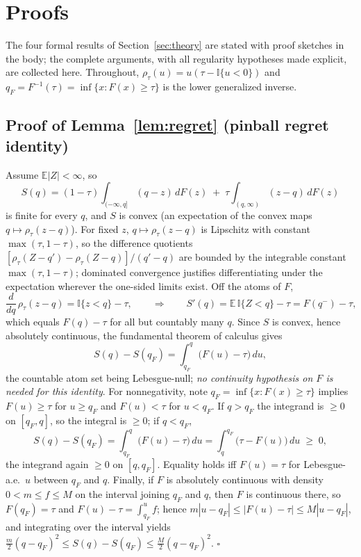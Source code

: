 \documentclass[11pt]{article}
\theoremstyle{remark}
\begin{document}



\appendix

\section{Proofs}\label{app:proofs}

The four formal results of Section~\ref{sec:theory} are stated with
proof sketches in the body; the complete arguments, with all regularity
hypotheses made explicit, are collected here. Throughout, $\rho_\tau(u)
= u(\tau - \mathbb{I}\{u<0\})$ and $q_F = F^{-1}(\tau) = \inf\{x:F(x)\ge
\tau\}$ is the lower generalized inverse.

\subsection*{Proof of Lemma~\ref{lem:regret} (pinball regret identity)}

Assume $\mathbb{E}|Z|<\infty$, so
\[
S(q) = (1-\tau)\!\int_{(-\infty,q]}\!(q-z)\,dF(z)
\;+\; \tau\!\int_{(q,\infty)}\!(z-q)\,dF(z)
\]
is finite for every $q$, and $S$ is convex (an expectation of the
convex maps $q\mapsto\rho_\tau(z-q)$). For fixed $z$, $q\mapsto
\rho_\tau(z-q)$ is Lipschitz with constant $\max(\tau,1-\tau)$, so the
difference quotients $[\rho_\tau(Z-q')-\rho_\tau(Z-q)]/(q'-q)$ are
bounded by the integrable constant $\max(\tau,1-\tau)$; dominated
convergence justifies differentiating under the expectation wherever the
one-sided limits exist. Off the atoms of $F$,
\[
\frac{d}{dq}\,\rho_\tau(z-q) = \mathbb{I}\{z<q\}-\tau ,
\qquad\Longrightarrow\qquad
S'(q) = \mathbb{E}\,\mathbb{I}\{Z<q\}-\tau = F(q^-)-\tau,
\]
which equals $F(q)-\tau$ for all but countably many $q$. Since $S$ is
convex, hence absolutely continuous, the fundamental theorem of
calculus gives
\[
S(q)-S(q_F)=\int_{q_F}^{q}\big(F(u)-\tau\big)\,du,
\]
the countable atom set being Lebesgue-null; \emph{no continuity
hypothesis on $F$ is needed for this identity}. For nonnegativity,
note $q_F=\inf\{x:F(x)\ge\tau\}$ implies $F(u)\ge\tau$ for $u\ge q_F$
and $F(u)<\tau$ for $u<q_F$. If $q>q_F$ the integrand is $\ge0$ on
$[q_F,q]$, so the integral is $\ge0$; if $q<q_F$,
\[
S(q)-S(q_F)=\int_{q_F}^{q}\big(F(u)-\tau\big)\,du
=\int_{q}^{q_F}\big(\tau-F(u)\big)\,du\;\ge\;0 ,
\]
the integrand again $\ge0$ on $[q,q_F]$. Equality holds iff $F(u)=\tau$
for Lebesgue-a.e.\ $u$ between $q_F$ and $q$. Finally, if $F$ is
absolutely continuous with density $0<m\le f\le M$ on the interval
joining $q_F$ and $q$, then $F$ is continuous there, so $F(q_F)=\tau$
and $F(u)-\tau=\int_{q_F}^{u}f$; hence $m|u-q_F|\le|F(u)-\tau|\le
M|u-q_F|$, and integrating over the interval yields
$\tfrac{m}{2}(q-q_F)^2\le S(q)-S(q_F)\le\tfrac{M}{2}(q-q_F)^2$.
\hfill$\square$
\end{document}

